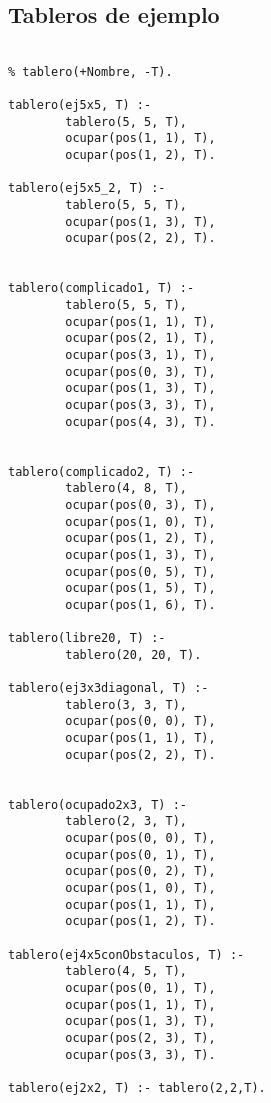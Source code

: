 \newpage
\subsection{Tableros de ejemplo}

\begin{verbatim}

% tablero(+Nombre, -T).

tablero(ej5x5, T) :-
        tablero(5, 5, T),
        ocupar(pos(1, 1), T),
        ocupar(pos(1, 2), T).

tablero(ej5x5_2, T) :-
        tablero(5, 5, T),
        ocupar(pos(1, 3), T),
        ocupar(pos(2, 2), T).


tablero(complicado1, T) :-
        tablero(5, 5, T),
        ocupar(pos(1, 1), T),
        ocupar(pos(2, 1), T),
        ocupar(pos(3, 1), T),
        ocupar(pos(0, 3), T),
        ocupar(pos(1, 3), T),
        ocupar(pos(3, 3), T),
        ocupar(pos(4, 3), T).


tablero(complicado2, T) :-
        tablero(4, 8, T),
        ocupar(pos(0, 3), T),
        ocupar(pos(1, 0), T),
        ocupar(pos(1, 2), T),
        ocupar(pos(1, 3), T),
        ocupar(pos(0, 5), T),
        ocupar(pos(1, 5), T),
        ocupar(pos(1, 6), T).

tablero(libre20, T) :-
        tablero(20, 20, T).

tablero(ej3x3diagonal, T) :-
        tablero(3, 3, T),
        ocupar(pos(0, 0), T),
        ocupar(pos(1, 1), T),
        ocupar(pos(2, 2), T).


tablero(ocupado2x3, T) :-
        tablero(2, 3, T),
        ocupar(pos(0, 0), T),
        ocupar(pos(0, 1), T),
        ocupar(pos(0, 2), T),
        ocupar(pos(1, 0), T),
        ocupar(pos(1, 1), T),
        ocupar(pos(1, 2), T).

tablero(ej4x5conObstaculos, T) :-
        tablero(4, 5, T),
        ocupar(pos(0, 1), T),
        ocupar(pos(1, 1), T),
        ocupar(pos(1, 3), T),
        ocupar(pos(2, 3), T),
        ocupar(pos(3, 3), T).

tablero(ej2x2, T) :- tablero(2,2,T).

\end{verbatim}

